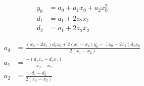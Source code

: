 \begin{align}
  y_0 & = a_0+a_1 x_0+a_2 x_0^{2}  \\
   d_1 & = a_1+2 a_2 x_1  \\
   d_2 & = a_1+2 a_2 x_2  
\end{align}

 
\begin{align}
   a_0 & = \frac
{\left(x_0 - 2 x_1\right) d_2 x_0+2 \left(x_1 - x_2\right) y_0 - \left(x_0 - 2  x_2\right) d_1 x_0}
{2 \left(x_1 - x_2\right)} \\
   a_1 & = \frac
{ -  \left(d_1 x_2 - d_2 x_1\right)}
{x_1 - x_2} \\
   a_2 & = \frac
{d_1 - d_2 }
{2 \left(x_1 - x_2\right)} 
\end{align}
